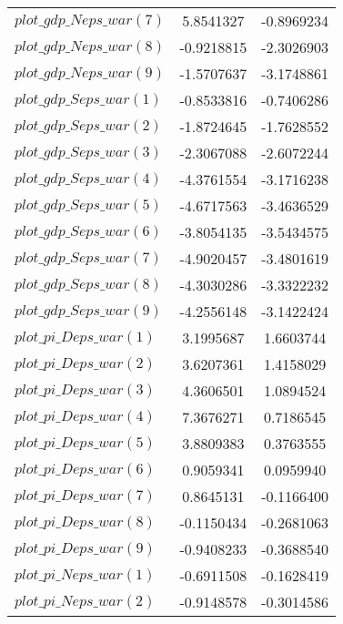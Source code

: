 \begin{center}
\begin{longtable}{lcc}
$plot\_gdp\_N eps\_war (7)  $	 & 	      5.8541327	 & 	     -0.8969234 \\ 
$plot\_gdp\_N eps\_war (8)  $	 & 	     -0.9218815	 & 	     -2.3026903 \\ 
$plot\_gdp\_N eps\_war (9)  $	 & 	     -1.5707637	 & 	     -3.1748861 \\ 
$plot\_gdp\_S eps\_war (1)  $	 & 	     -0.8533816	 & 	     -0.7406286 \\ 
$plot\_gdp\_S eps\_war (2)  $	 & 	     -1.8724645	 & 	     -1.7628552 \\ 
$plot\_gdp\_S eps\_war (3)  $	 & 	     -2.3067088	 & 	     -2.6072244 \\ 
$plot\_gdp\_S eps\_war (4)  $	 & 	     -4.3761554	 & 	     -3.1716238 \\ 
$plot\_gdp\_S eps\_war (5)  $	 & 	     -4.6717563	 & 	     -3.4636529 \\ 
$plot\_gdp\_S eps\_war (6)  $	 & 	     -3.8054135	 & 	     -3.5434575 \\ 
$plot\_gdp\_S eps\_war (7)  $	 & 	     -4.9020457	 & 	     -3.4801619 \\ 
$plot\_gdp\_S eps\_war (8)  $	 & 	     -4.3030286	 & 	     -3.3322232 \\ 
$plot\_gdp\_S eps\_war (9)  $	 & 	     -4.2556148	 & 	     -3.1422424 \\ 
$plot\_pi\_D eps\_war (1)   $	 & 	      3.1995687	 & 	      1.6603744 \\ 
$plot\_pi\_D eps\_war (2)   $	 & 	      3.6207361	 & 	      1.4158029 \\ 
$plot\_pi\_D eps\_war (3)   $	 & 	      4.3606501	 & 	      1.0894524 \\ 
$plot\_pi\_D eps\_war (4)   $	 & 	      7.3676271	 & 	      0.7186545 \\ 
$plot\_pi\_D eps\_war (5)   $	 & 	      3.8809383	 & 	      0.3763555 \\ 
$plot\_pi\_D eps\_war (6)   $	 & 	      0.9059341	 & 	      0.0959940 \\ 
$plot\_pi\_D eps\_war (7)   $	 & 	      0.8645131	 & 	     -0.1166400 \\ 
$plot\_pi\_D eps\_war (8)   $	 & 	     -0.1150434	 & 	     -0.2681063 \\ 
$plot\_pi\_D eps\_war (9)   $	 & 	     -0.9408233	 & 	     -0.3688540 \\ 
$plot\_pi\_N eps\_war (1)   $	 & 	     -0.6911508	 & 	     -0.1628419 \\ 
$plot\_pi\_N eps\_war (2)   $	 & 	     -0.9148578	 & 	     -0.3014586 \\ 

\end{longtable}
\end{center}
